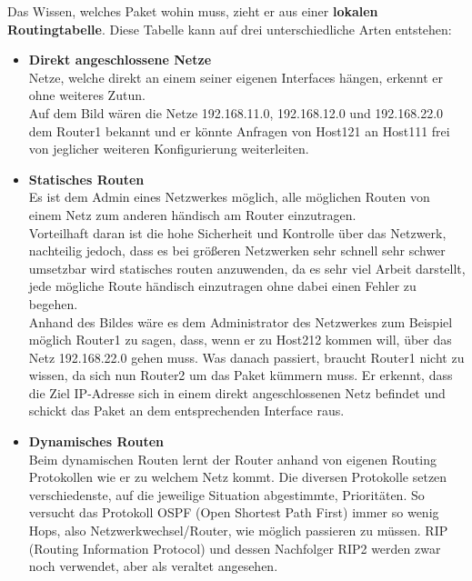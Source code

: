 \documentclass[12pt,a4paper]{report}
\begin{document}
\begin{onehalfspace}
Das Wissen, welches Paket wohin muss, zieht er aus einer \textbf{lokalen Routingtabelle}. Diese Tabelle kann auf drei unterschiedliche Arten entstehen:\\
\begin{itemize}
\item \textbf{Direkt angeschlossene Netze}\\
Netze, welche direkt an einem seiner eigenen Interfaces hängen, erkennt er ohne weiteres Zutun.\\
Auf dem Bild wären die Netze 192.168.11.0, 192.168.12.0 und 192.168.22.0 dem Router1 bekannt und er könnte Anfragen von Host121 an Host111 frei von jeglicher weiteren Konfigurierung weiterleiten.
\item \textbf{Statisches Routen}\\
Es ist dem Admin eines Netzwerkes möglich, alle möglichen Routen von einem Netz zum anderen händisch am Router einzutragen.\\
Vorteilhaft daran ist die hohe Sicherheit und Kontrolle über das Netzwerk, nachteilig jedoch, dass es bei größeren Netzwerken sehr schnell sehr schwer umsetzbar wird statisches routen anzuwenden, da es sehr viel Arbeit darstellt, jede mögliche Route händisch einzutragen ohne dabei einen Fehler zu begehen.\\
Anhand des Bildes wäre es dem Administrator des Netzwerkes zum Beispiel möglich Router1 zu sagen, dass, wenn er zu Host212 kommen will, über das Netz 192.168.22.0 gehen muss. Was danach passiert, braucht Router1 nicht zu wissen, da sich nun Router2 um das Paket kümmern muss. Er erkennt, dass die Ziel IP-Adresse sich in einem direkt angeschlossenen Netz befindet und schickt das Paket an dem entsprechenden Interface raus.
\item \textbf{Dynamisches Routen}\\
Beim dynamischen Routen lernt der Router anhand von eigenen Routing Protokollen wie er zu welchem Netz kommt. Die diversen Protokolle setzen verschiedenste, auf die jeweilige Situation abgestimmte, Prioritäten. So versucht das Protokoll OSPF (Open Shortest Path First) immer so wenig Hops, also Netzwerkwechsel/Router, wie möglich passieren zu müssen. RIP (Routing Information Protocol) und dessen Nachfolger RIP2 werden zwar noch verwendet, aber als veraltet angesehen.
\end{itemize}


\end{onehalfspace}
\end{document}
